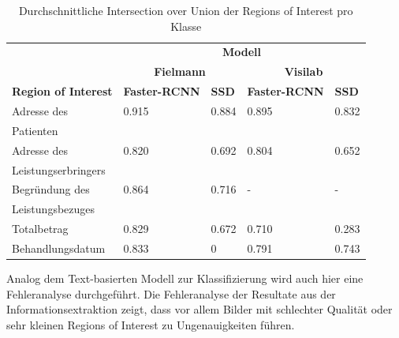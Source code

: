 \begin{table}[h!]
    \centering
    \captionsetup{width=.9\linewidth}
    \caption{Durchschnittliche Intersection over Union der Regions of Interest pro Klasse}
    \label{tab:specific-ie-iou}
    \begin{tabular}{|l|l|l|l|l|}
    \hhline{~|----|}    
    \multicolumn{1}{c|}{}
                                    & \multicolumn{4}{c|}{\cellcolor[HTML]{C0E5FD}\textbf{Modell}}  \\
    \hhline{~|--|--|}
    \multicolumn{1}{c|}{}
                                    & \multicolumn{2}{c|}{\cellcolor[HTML]{C0E5FD}\textbf{Fielmann}} 
                                                            & \multicolumn{2}{c|}{\cellcolor[HTML]{C0E5FD}\textbf{Visilab}} \\
    \hline
    \rowcolor[HTML]{C0E5FD}     
    \textbf{Region of Interest}     & \textbf{Faster-RCNN}  & \textbf{SSD}        & \textbf{Faster-RCNN}  & \textbf{SSD} \\
    \hline
    Adresse des                     & 0.915    & 0.884      & 0.895 & 0.832 \\
    Patienten &&&& \\
    \hline
    Adresse des                     & 0.820    & 0.692      & 0.804 & 0.652 \\
    Leistungserbringers &&&& \\
    \hline
    Begründung des                  & 0.864    & 0.716      & - & - \\
    Leistungsbezuges &&&& \\
    \hline
    Totalbetrag                     & 0.829    & 0.672      & 0.710 & 0.283 \\
    \hline
    Behandlungsdatum                & 0.833    & 0          & 0.791 & 0.743 \\
    \hline
    \end{tabular}
\end{table}

Analog dem Text-basierten Modell zur Klassifizierung wird auch hier eine Fehleranalyse durchgeführt. Die Fehleranalyse der Resultate aus der Informationsextraktion zeigt, dass vor allem Bilder mit schlechter Qualität oder sehr kleinen Regions of Interest zu Ungenauigkeiten führen.

